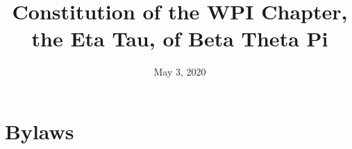 \documentclass[12pt]{article}
\title{Constitution of the WPI Chapter, the Eta Tau, of Beta Theta Pi}
\date{May 3, 2020}
\newcounter{article}
\begin{document}
\begin{titlepage}
\maketitle
\end{titlepage}

\clearpage

\part{Bylaws}




















\end{document}
